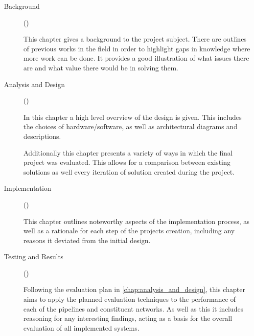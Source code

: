 \begin{description}
      \item[Background] ()

            This chapter gives a background to the project subject. There are outlines of previous works in the field in order to highlight gaps in knowledge where more work can be done. It provides a good illustration of what issues there are and what value there would be in solving them.




      \item[Analysis and Design] ()
      
      In this chapter a high level overview of the design is given. This includes the choices of hardware/software, as well as architectural diagrams and descriptions.

      Additionally this chapter presents a variety of ways in which the final project was evaluated. This allows for a comparison between existing solutions as well every iteration of solution created during the project.

      \item[Implementation] ()

      This chapter outlines noteworthy aspects of the implementation process, as well as a rationale for each step of the projects creation, including any reasons it deviated from the initial design.

      \item[Testing and Results] ()
      
      Following the evaluation plan in \cref{chap:analysis_and_design}, this chapter aims to apply the planned evaluation techniques to the performance of each of the pipelines and constituent networks. As well as this it includes reasoning for any interesting findings, acting as a basis for the overall evaluation of all implemented systems.


\end{description}
